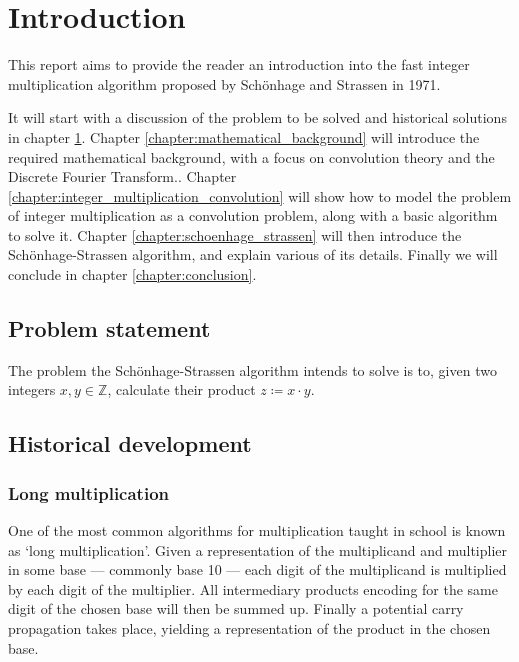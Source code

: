 \chapter{Introduction}
\label{chapter:introduction}

This report aims to provide the reader an introduction into the fast integer
multiplication algorithm proposed by Schönhage and Strassen in 1971.
\autocite{schonhageSchnelleMultiplikationGrosser1971}

It will start with a discussion of the problem to be solved and historical
solutions in chapter \ref{chapter:introduction}. Chapter
\ref{chapter:mathematical_background} will introduce the required mathematical
background, with a focus on convolution theory and the Discrete Fourier
Transform.. Chapter \ref{chapter:integer_multiplication_convolution} will show
how to model the problem of integer multiplication as a convolution problem,
along with a basic algorithm to solve it. Chapter
\ref{chapter:schoenhage_strassen} will then introduce the Schönhage-Strassen
algorithm, and explain various of its details. Finally we will conclude in
chapter \ref{chapter:conclusion}.

\section{Problem statement}

The problem the Schönhage-Strassen algorithm intends to solve is to, given two
integers $x, y \in \mathbb{Z}$, calculate their product $z \coloneqq x \cdot
y$.

\section{Historical development}

\subsection{Long multiplication}

One of the most common algorithms for multiplication taught in school is known
as `long multiplication'. Given a representation of the multiplicand and
multiplier in some base --- commonly base 10 --- each digit of the multiplicand
is multiplied by each digit of the multiplier. All intermediary products
encoding for the same digit of the chosen base will then be summed up. Finally
a potential carry propagation takes place, yielding a representation of the
product in the chosen base.

